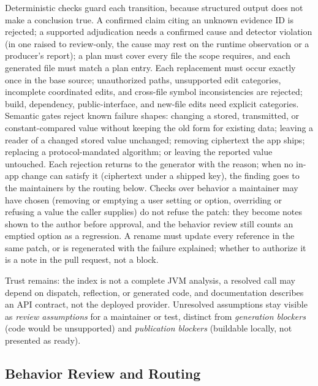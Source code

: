 \documentclass[conference]{IEEEtran}
\begin{document}
Deterministic checks guard each transition, because structured output does not
make a conclusion true. A confirmed claim citing an unknown evidence ID is
rejected; a supported adjudication needs a confirmed cause and detector
violation (in one raised to review-only, the cause may rest on the runtime
observation or a producer's report); a plan must cover every file the scope requires, and each generated
file must match a plan entry. Each replacement must occur exactly once in the
base source; unauthorized paths, unsupported edit categories, incomplete
coordinated edits, and cross-file symbol inconsistencies are rejected; build,
dependency, public-interface, and new-file edits need explicit categories.
Semantic gates reject known failure shapes: changing a stored, transmitted, or
constant-compared value without keeping the old form for existing data; leaving
a reader of a changed stored value unchanged; removing ciphertext the app
ships; replacing a protocol-mandated algorithm; or leaving the reported value
untouched. Each rejection returns to the generator with the reason; when no
in-app change can satisfy it (ciphertext under a shipped key), the finding goes
to the maintainers by the routing below. Checks over behavior a maintainer may
have chosen (removing or emptying a user setting or option, overriding or
refusing a value the caller supplies) do not refuse the patch: they become
notes shown to the author before approval, and the behavior review still
counts an emptied option as a regression. A rename must update every reference
in the same patch, or is regenerated with the failure explained; whether to
authorize it is a note in the pull request, not a block.

Trust remains: the index is not a complete JVM analysis, a resolved call may
depend on dispatch, reflection, or generated code, and documentation describes
an API contract, not the deployed provider. Unresolved assumptions stay
visible as \emph{review assumptions} for a maintainer or test, distinct from
\emph{generation blockers} (code would be unsupported) and \emph{publication
blockers} (buildable locally, not presented as ready).

\subsection{Behavior Review and Routing}
\end{document}

